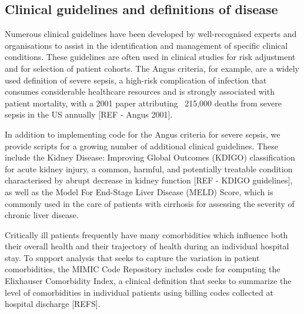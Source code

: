\documentclass{elsart}
\begin{document}
\subsection{Clinical guidelines and definitions of disease}




Numerous clinical guidelines have been developed by well-recognised experts and organisations to assist in the identification and management of specific clinical conditions. These guidelines are often used in clinical studies for risk adjustment and for selection of patient cohorts. The Angus criteria, for example, are a widely used definition of severe sepsis, a high-risk complication of infection that consumes considerable healthcare resources and is strongly associated with patient mortality, with a 2001 paper attributing ~215,000 deaths from severe sepsis in the US annually [REF - Angus 2001]. 

In addition to implementing code for the Angus criteria for severe sepsis, we provide scripts for a growing number of additional clinical guidelines. These include the Kidney Disease: Improving Global Outcomes (KDIGO) classification for acute kidney injury, a common, harmful, and potentially treatable condition characterised by abrupt decrease in kidney function [REF - KDIGO guidelines], as well as the Model For End-Stage Liver Disease (MELD) Score, which is commonly used in the care of patients with cirrhosis for assessing the severity of chronic liver disease.

Critically ill patients frequently have many comorbidities which influence both their overall health and their trajectory of health during an individual hospital stay. To support analysis that seeks to capture the variation in patient comorbidities, the MIMIC Code Repository includes code for computing the Elixhauser Comorbidity Index, a clinical definition that seeks to summarize the level of comorbidities in individual patients using billing codes collected at hospital discharge [REFS].
\end{document}
